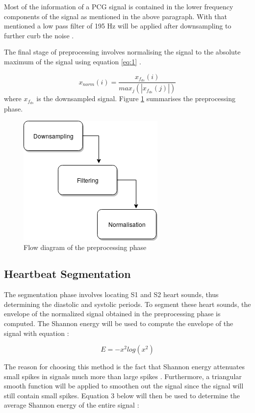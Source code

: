 \documentclass[10pt,twocolumn]{witseiepaper}
\begin{document}
Most of the information of a PCG signal is contained in the lower frequency components of the signal as mentioned in the above paragraph. With that mentioned a low pass filter of 195 Hz will be applied after downsampling to further curb the noise \cite{pascal}.

The final stage of preprocessing involves normalising the signal to the absolute maximum of the signal using equation \ref{eq:1} \cite{liang1997heart}.

\begin{equation}
    x_{norm}(i) = \frac{x_{f_{ds}}(i)}{max_{j}(|x_{f_{ds}}(j)|)}
    \label{eq:1}
\end{equation}{}
where $x_{f_{ds}}$ is the downsampled signal. 
Figure \ref{fig:pre} summarises the preprocessing phase.

\begin{figure}[h!]
    \centering
    \includegraphics[scale=0.7]{Project_Plan/preproc.png}
    \caption{Flow diagram of the preprocessing phase}
    \label{fig:pre}
\end{figure}{}

\subsection{Heartbeat Segmentation}
The segmentation phase involves locating S1 and S2 heart sounds, thus determining the diastolic and systolic periods. To segment these heart sounds, the envelope of the normalized signal obtained in the preprocessing phase is computed. The Shannon energy will be used to compute the envelope of the signal with equation \cite{liang1997heart}:

\begin{equation}
    E = -x^2log(x^2)
\end{equation}{}

The reason for choosing this method is the fact that Shannon energy attenuates small spikes in signals much more than large spikes \cite{liang1997heart}. Furthermore, a triangular smooth function will be applied to smoothen out the signal since the signal will still contain small spikes. Equation 3 below will then be used to determine the average Shannon energy of the entire signal \cite{liang1997heart}:
\end{document}
